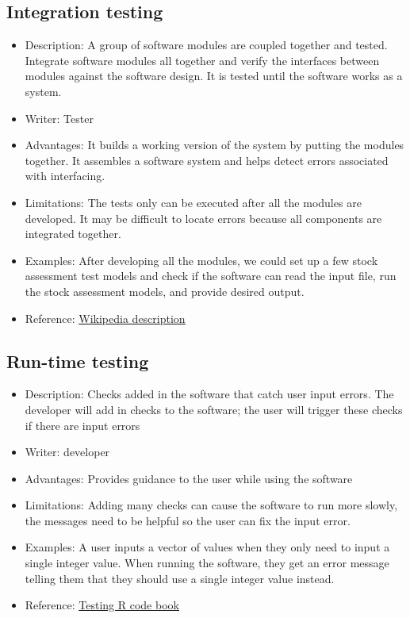 \documentclass[
]{book}
\begin{document}
\hypertarget{integration-testing}{%
\subsection{Integration testing}\label{integration-testing}}

\begin{itemize}
\item
  Description: A group of software modules are coupled together and tested. Integrate software modules all together and verify the interfaces between modules against the software design. It is tested until the software works as a system.
\item
  Writer: Tester
\item
  Advantages: It builds a working version of the system by putting the modules together. It assembles a software system and helps detect errors associated with interfacing.
\item
  Limitations: The tests only can be executed after all the modules are developed. It may be difficult to locate errors because all components are integrated together.
\item
  Examples: After developing all the modules, we could set up a few stock assessment test models and check if the software can read the input file, run the stock assessment models, and provide desired output.
\item
  Reference: \href{https://en.wikipedia.org/wiki/Integration_testing}{\underline{Wikipedia description}}
\end{itemize}

\hypertarget{run-time-testing}{%
\subsection{Run-time testing}\label{run-time-testing}}

\begin{itemize}
\item
  Description: Checks added in the software that catch user input errors. The developer will add in checks to the software; the user will trigger these checks if there are input errors
\item
  Writer: developer
\item
  Advantages: Provides guidance to the user while using the software
\item
  Limitations: Adding many checks can cause the software to run more slowly, the messages need to be helpful so the user can fix the input error.
\item
  Examples: A user inputs a vector of values when they only need to input a single integer value. When running the software, they get an error message telling them that they should use a single integer value instead.
\item
  Reference: \href{http://www.crcpress.com/9781498763653}{\underline{Testing R code book}}
\end{itemize}
\end{document}
